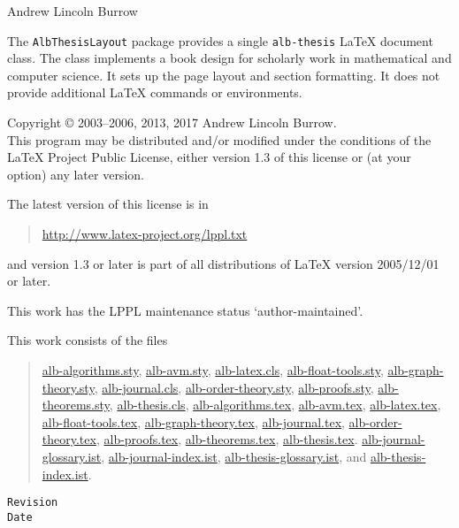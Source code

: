 \documentclass[11pt,a4paper,oneside,titlepage]{alb-latex}
\begin{document}


\begin{albTitlePage}


  Andrew Lincoln Burrow


  The \texttt{AlbThesisLayout} package provides a single
  \texttt{alb-thesis} \LaTeX{} document class.  The class implements a
  book design for scholarly work in mathematical and computer science.
  It sets up the page layout and section formatting.  It does not
  provide additional \LaTeX{} commands or environments.



  Copyright \copyright{} 2003--2006, 2013, 2017 Andrew Lincoln Burrow.\\
  This program may be distributed and/or modified under the conditions
  of the \LaTeX{} Project Public License, either version 1.3 of this
  license or (at your option) any later version.

  \medskip{}

  The latest version of this license is in
  \begin{quote}
    \url{http://www.latex-project.org/lppl.txt}
  \end{quote}
  and version 1.3 or later is part of all distributions of LaTeX version
  2005/12/01 or later.

  \medskip{}

  This work has the LPPL maintenance status `author-maintained'.

  \medskip{}

  This work consists of the files
  \begin{quote}
    \begin{flushleft}
      \url{alb-algorithms.sty}, \url{alb-avm.sty}, \url{alb-latex.cls},
      \url{alb-float-tools.sty}, \url{alb-graph-theory.sty},
      \url{alb-journal.cls}, \url{alb-order-theory.sty},
      \url{alb-proofs.sty}, \url{alb-theorems.sty},
      \url{alb-thesis.cls}, \url{alb-algorithms.tex}, \url{alb-avm.tex},
      \url{alb-latex.tex}, \url{alb-float-tools.tex},
      \url{alb-graph-theory.tex}, \url{alb-journal.tex},
      \url{alb-order-theory.tex}, \url{alb-proofs.tex},
      \url{alb-theorems.tex}, \url{alb-thesis.tex}.
      \url{alb-journal-glossary.ist}, \url{alb-journal-index.ist},
      \url{alb-thesis-glossary.ist}, and \url{alb-thesis-index.ist}.
    \end{flushleft}
  \end{quote}



  \verb$Revision$\\
  \verb$Date$

\end{albTitlePage}
\end{document}
